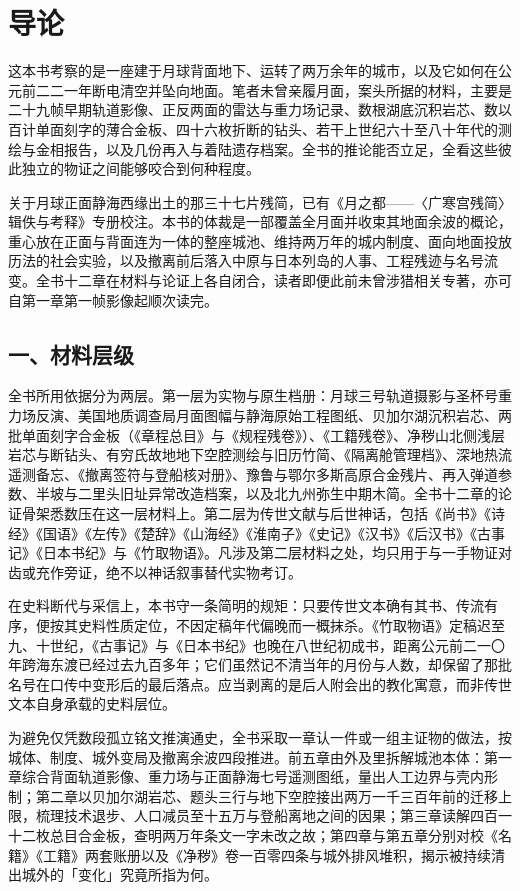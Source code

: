 \chapter*{导\quad 论}
{}

这本书考察的是一座建于月球背面地下、运转了两万余年的城市，以及它如何在公元前二二一年断电清空并坠向地面。笔者未曾亲履月面，案头所据的材料，主要是二十九帧早期轨道影像、正反两面的雷达与重力场记录、数根湖底沉积岩芯、数以百计单面刻字的薄合金板、四十六枚折断的钻头、若干上世纪六十至八十年代的测绘与金相报告，以及几份再入与着陆遗存档案。全书的推论能否立足，全看这些彼此独立的物证之间能够咬合到何种程度。

关于月球正面静海西缘出土的那三十七片残简，已有《月之都——〈广寒宫残简〉辑佚与考释》专册校注。本书的体裁是一部覆盖全月面并收束其地面余波的概论，重心放在正面与背面连为一体的整座城池、维持两万年的城内制度、面向地面投放历法的社会实验，以及撤离前后落入中原与日本列岛的人事、工程残迹与名号流变。全书十二章在材料与论证上各自闭合，读者即便此前未曾涉猎相关专著，亦可自第一章第一帧影像起顺次读完。

\section*{一、材料层级}

全书所用依据分为两层。第一层为实物与原生档册：月球三号轨道摄影与圣杯号重力场反演、美国地质调查局月面图幅与静海原始工程图纸、贝加尔湖沉积岩芯、两批单面刻字合金板（《章程总目》与《规程残卷》）、《工籍残卷》、净秽山北侧浅层岩芯与断钻头、有穷氏故地地下空腔测绘与旧历竹简、《隔离舱管理档》、深地热流遥测备忘、《撤离签符与登船核对册》、豫鲁与鄂尔多斯高原合金残片、再入弹道参数、半坡与二里头旧址异常改造档案，以及北九州弥生中期木简。全书十二章的论证骨架悉数压在这一层材料上。第二层为传世文献与后世神话，包括《尚书》《诗经》《国语》《左传》《楚辞》《山海经》《淮南子》《史记》《汉书》《后汉书》《古事记》《日本书纪》与《竹取物语》。凡涉及第二层材料之处，均只用于与一手物证对齿或充作旁证，绝不以神话叙事替代实物考订。

在史料断代与采信上，本书守一条简明的规矩：只要传世文本确有其书、传流有序，便按其史料性质定位，不因定稿年代偏晚而一概抹杀。《竹取物语》定稿迟至九、十世纪，《古事记》与《日本书纪》也晚在八世纪初成书，距离公元前二一〇年跨海东渡已经过去九百多年；它们虽然记不清当年的月份与人数，却保留了那批名号在口传中变形后的最后落点。应当剥离的是后人附会出的教化寓意，而非传世文本自身承载的史料层位。

为避免仅凭数段孤立铭文推演通史，全书采取一章认一件或一组主证物的做法，按城体、制度、城外变局及撤离余波四段推进。前五章由外及里拆解城池本体：第一章综合背面轨道影像、重力场与正面静海七号遥测图纸，量出人工边界与壳内形制；第二章以贝加尔湖岩芯、题头三行与地下空腔接出两万一千三百年前的迁移上限，梳理技术退步、人口减员至十五万与登船离地之间的因果；第三章读解四百一十二枚总目合金板，查明两万年条文一字未改之故；第四章与第五章分别对校《名籍》《工籍》两套账册以及《净秽》卷一百零四条与城外排风堆积，揭示被持续清出城外的「变化」究竟所指为何。

